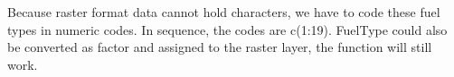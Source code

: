 \documentclass[a4paper]{book}
\begin{document}
\begin{Details}
Because raster format data cannot hold characters, we have to code these fuel
types in numeric codes. In sequence, the codes are c(1:19). FuelType could 
also be converted as factor and assigned to the raster layer, the function 
will still work.


\end{Details}
%
\end{document}
